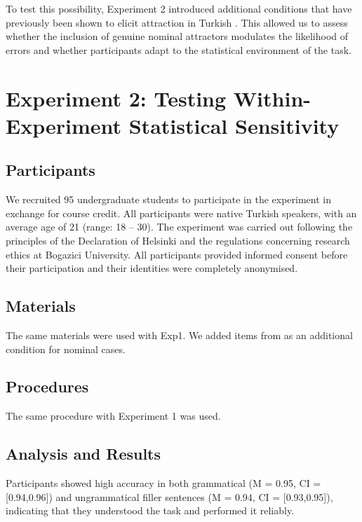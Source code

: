 \documentclass[
  authoryear,
  3p]{elsarticle}
\begin{document}
To test this possibility, Experiment 2 introduced additional conditions
that have previously been shown to elicit attraction in Turkish
\citep{TurkLogacev2024, LagoEtAl2019}. This allowed us to assess whether
the inclusion of genuine nominal attractors modulates the likelihood of
errors and whether participants adapt to the statistical environment of
the task.

\section{Experiment 2: Testing Within-Experiment Statistical
Sensitivity}\label{experiment-2-testing-within-experiment-statistical-sensitivity}

\subsection{Participants}\label{participants-1}

We recruited 95 undergraduate students to participate in the experiment
in exchange for course credit. All participants were native Turkish
speakers, with an average age of 21 (range: 18 -- 30). The experiment
was carried out following the principles of the Declaration of Helsinki
and the regulations concerning research ethics at Bogazici University.
All participants provided informed consent before their participation
and their identities were completely anonymised.

\subsection{Materials}\label{materials-1}

The same materials were used with Exp1. We added items from
\citet{TurkLogacev2024} as an additional condition for nominal cases.

\subsection{Procedures}\label{procedures-1}

The same procedure with Experiment 1 was used.

\subsection{Analysis and Results}\label{analysis-and-results-1}

Participants showed high accuracy in both grammatical (M = 0.95, CI =
{[}0.94,0.96{]}) and ungrammatical filler sentences (M = 0.94, CI =
{[}0.93,0.95{]}), indicating that they understood the task and performed
it reliably.
\end{document}
